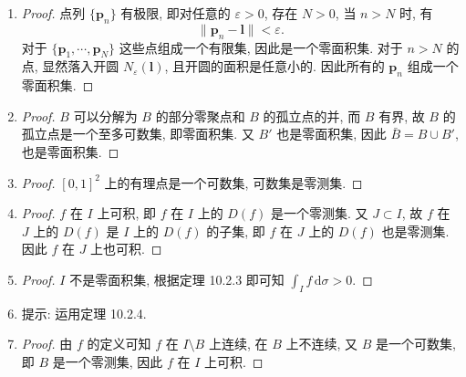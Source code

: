 % 
\begin{enumerate}
    \item %
        \begin{proof}
            点列 $\{\boldsymbol{p}_n\}$ 有极限, 即对任意的 $\varepsilon > 0$, 存在 $N > 0$, 当 $n > N$ 时, 有
            \[
                \|\boldsymbol{p}_n - \boldsymbol{l}\| < \varepsilon.    
            \]
            对于 $\{\boldsymbol{p}_1,\cdots,\boldsymbol{p}_N\}$ 这些点组成一个有限集, 因此是一个零面积集.
            对于 $n>N$ 的点, 显然落入开圆 $N_\varepsilon(\boldsymbol{l})$, 且开圆的面积是任意小的.
            因此所有的 $\boldsymbol{p}_n$ 组成一个零面积集. 
        \end{proof}
    \item %
        \begin{proof}
            $B$ 可以分解为 $B$ 的部分零聚点和 $B$ 的孤立点的并, 而 $B$ 有界, 故 $B$ 的孤立点是一个至多可数集, 即零面积集. 又 $B'$ 也是零面积集,
            因此 $\bar{B} = B \cup B'$, 也是零面积集.
        \end{proof}
    \item %
        \begin{proof}
            $[0, 1]^2$ 上的有理点是一个可数集, 可数集是零测集.
        \end{proof}
    \item %
        \begin{proof}
            $f$ 在 $I$ 上可积, 即 $f$ 在 $I$ 上的 $D(f)$ 是一个零测集. 又 $J \subset I$, 故 $f$ 在 $J$ 上的 $D(f)$ 是 $I$ 上的 $D(f)$ 的子集,
            即 $f$ 在 $J$ 上的 $D(f)$ 也是零测集. 因此 $f$ 在 $J$ 上也可积.
        \end{proof}
    \item %
        \begin{proof}
            $I$ 不是零面积集, 根据定理 10.2.3 即可知 $\displaystyle{\int_I f\,\mathrm{d}\sigma > 0}$.
        \end{proof}
    \item %
        提示: 运用定理 10.2.4.
    \item %
        \begin{proof}
            由 $f$ 的定义可知 $f$ 在 $I \setminus B$ 上连续, 在 $B$ 上不连续, 又 $B$ 是一个可数集, 即 $B$ 是一个零测集, 因此 $f$ 在 $I$ 上可积.

\end{proof}
\end{enumerate}
